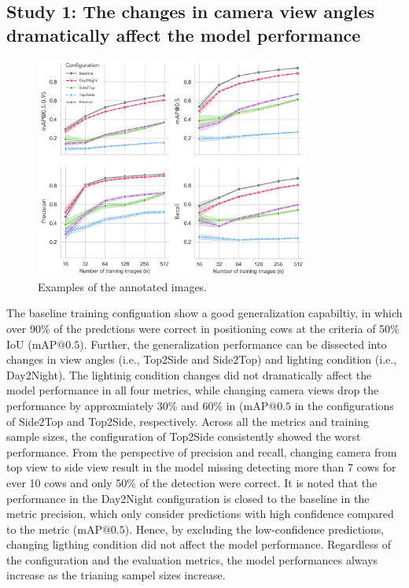 \subsection*{Study 1: The changes in camera view angles dramatically affect the model performance}


\begin{figure}[H]
    \centering
    \includegraphics[width=0.8\textwidth]{figure_3.jpg}
    \caption{Examples of the annotated images.}
    \label{fig:schemes}
\end{figure}

The baseline training configuation show a good generalization capabiltiy, in which over 90\% of the predctions were correct in positioning cows at the criteria of 50\% IoU ($\text{mAP@{0.5}}$). Further, the generalization performance can be dissected into changes in view angles (i.e., Top2Side and Side2Top) and lighting condition (i.e., Day2Night). The lightinig condition changes did not dramatically affect the model performance in all four metrics, while changing camera views drop the performance by approxmiately 30\% and 60\% in ($\text{mAP@{0.5}}$ in the configurations of Side2Top and Top2Side, respectively. Across all the metrics and training sample sizes, the configuration of Top2Side consistently showed the worst performance. From the perspective of precision and recall, changing camera from top view to side view result in the model missing detecting more than 7 cows for ever 10 cows and only 50\% of the detection were correct. It is noted that the performance in the Day2Night configuration is closed to the baseline in the metric precision, which only consider predictions with high confidence compared to the metric ($\text{mAP@{0.5}}$). Hence, by excluding the low-confidence predictions, changing ligthing condition did not affect the model performance. Regardless of the configuration and the evaluation metrics, the model performances always increase as the trianing sampel sizes increase.



